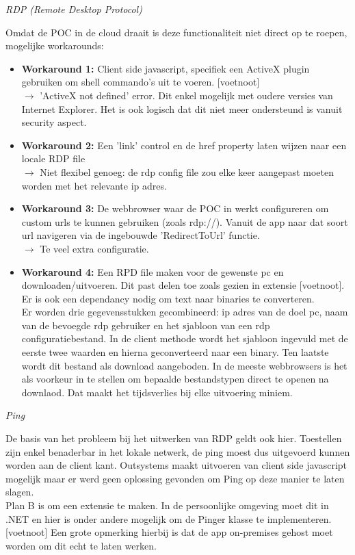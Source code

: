 \textit{RDP (Remote Desktop Protocol)}

Omdat de POC in de cloud draait is deze functionaliteit niet direct op te roepen, mogelijke workarounds:
\begin{itemize}
    \item \textbf{Workaround 1:} Client side javascript, specifiek een ActiveX plugin gebruiken om shell commando's uit te voeren. [voetnoot]\\
    $\rightarrow$ 'ActiveX not defined' error. Dit enkel mogelijk met oudere versies van Internet Explorer. Het is ook logisch dat dit niet meer ondersteund is vanuit security aspect.
    \item \textbf{Workaround 2:} Een 'link' control en de href property laten wijzen naar een locale RDP file\\
    $\rightarrow$ Niet flexibel genoeg: de rdp config file zou elke keer aangepast moeten worden met het relevante ip adres.
    \item \textbf{Workaround 3:} De webbrowser waar de POC in werkt configureren om custom urls te kunnen gebruiken (zoals rdp://). Vanuit de app naar dat soort url navigeren via de ingebouwde 'RedirectToUrl' functie.\\
    $\rightarrow$ Te veel extra configuratie.
    \item \textbf{Workaround 4:} Een RPD file maken voor de gewenste pc en downloaden/uitvoeren. Dit past delen toe zoals gezien in extensie [voetnoot]. Er is ook een dependancy nodig om text naar binaries te converteren.\\
    Er worden drie gegevensstukken gecombineerd: ip adres van de doel pc, naam van de bevoegde rdp gebruiker en het sjabloon van een rdp configuratiebestand. In de client methode wordt het sjabloon ingevuld met de eerste twee waarden en hierna geconverteerd naar een binary. Ten laatste wordt dit bestand als download aangeboden. In de meeste webbrowsers is het als voorkeur in te stellen om bepaalde bestandstypen direct te openen na downlaod. Dat maakt het tijdsverlies bij elke uitvoering miniem.
\end{itemize}

\textit{Ping}

De basis van het probleem bij het uitwerken van RDP geldt ook hier. Toestellen zijn enkel benaderbar in het lokale netwerk, de ping moest dus uitgevoerd kunnen worden aan de client kant. Outsystems maakt uitvoeren van client side javascript mogelijk maar er werd geen oplossing gevonden om Ping op deze manier te laten slagen.\\
Plan B is om een extensie te maken. In de persoonlijke omgeving moet dit in .NET en hier is onder andere mogelijk om de Pinger klasse te implementeren. [voetnoot] Een grote opmerking hierbij is dat de app on-premises gehost moet worden om dit echt te laten werken.

